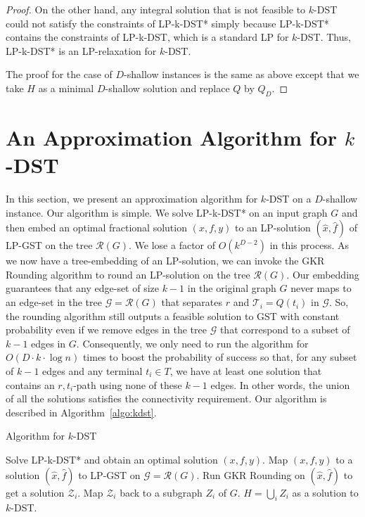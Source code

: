 \documentclass[11pt]{article}
\theoremstyle{definition}
\theoremstyle{remark}
\newcommand{\calG}{\mathcal{G}}
\newcommand{\calT}{\mathcal{T}}
\newcommand{\calR}{\mathcal{R}}
\newcommand{\calZ}{\mathcal{Z}}
\begin{document}
\begin{proof}
On the other hand, any integral solution that is not feasible to
$k$-DST could not satisfy the constraints of LP-k-DST* simply
because LP-k-DST* contains the constraints of LP-k-DST, which is a
standard LP for $k$-DST.
Thus, LP-k-DST* is an LP-relaxation for $k$-DST.

The proof for the case of $D$-shallow instances is the same as above  
except that we take $H$ as a minimal $D$-shallow solution
and replace $Q$ by $Q_D$. 
\end{proof}


\section{An Approximation Algorithm for $k$-DST}
\label{sec:algo-kDST}

In this section, we present an approximation algorithm
for $k$-DST on a $D$-shallow instance. 
Our algorithm is simple.
We solve LP-k-DST* on an input graph $G$ 
and then embed an optimal fractional solution $(x,f,y)$ to 
an LP-solution $(\hat{x},\hat{f})$ of LP-GST on the tree $\calR(G)$. 
We lose a factor of $O(k^{D-2})$ in this process.
As we now have a tree-embedding of an LP-solution,
we can invoke the GKR Rounding algorithm \cite{GargKR00} to round
an LP-solution on the tree $\calR(G)$.
Our embedding guarantees that any edge-set of size $k-1$ 
in the original graph $G$ never maps to 
an edge-set in the tree $\calG=\calR(G)$ that 
separates $r$ and $\calT_i=Q(t_i)$ in $\calG$. 
So, the rounding algorithm still outputs a feasible solution to GST
with constant probability even if we remove edges in the tree
$\calG$ that correspond to a subset of $k-1$ edges in $G$.
Consequently, we only need to run the algorithm for 
$O(D\cdot k\cdot \log n)$ times
to boost the probability of success so that,
for any subset of $k-1$ edges and any terminal $t_i\in T$,
we have at least one solution that 
contains an $r,t_i$-path using none of these $k-1$ edges.
In other words, the union of all the solutions
satisfies the connectivity requirement.
Our algorithm is described in Algorithm~\ref{algo:kdst}.

\begin{algorithm}
\caption{Algorithm for $k$-DST}
\begin{algorithmic}
\label{algo:kdst}
\STATE Solve LP-k-DST* and obtain an optimal solution $(x,f,y)$.
\STATE Map $(x,f,y)$ to a solution $(\hat{x},\hat{f})$ to LP-GST on $\calG=\calR(G)$.
   \STATE Run GKR Rounding on $(\hat{x},\hat{f})$ to get a solution $\calZ_i$. 
   \STATE Map $\calZ_i$ back to a subgraph $Z_i$ of $G$.
\ENDFOR
\RETURN $H=\bigcup_iZ_i$ as a solution to $k$-DST.
\end{algorithmic}
\end{algorithm}
\end{document}
